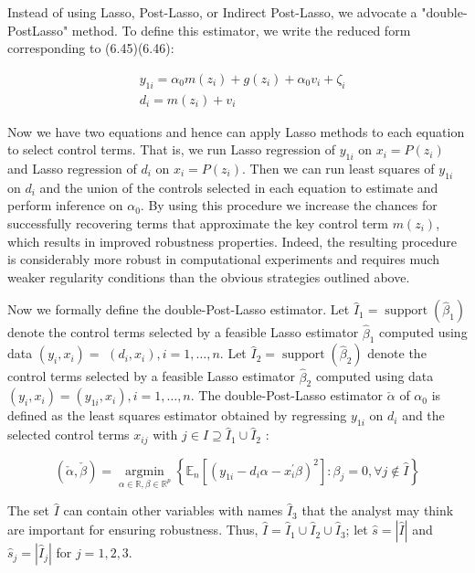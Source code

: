 \documentclass[10pt]{article}
\begin{document}
Instead of using Lasso, Post-Lasso, or Indirect Post-Lasso, we advocate a "double-PostLasso" method. To define this estimator, we write the reduced form corresponding to (6.45)(6.46):

\[
\begin{aligned}
& y_{1 i}=\alpha_{0} m\left(z_{i}\right)+g\left(z_{i}\right)+\alpha_{0} v_{i}+\zeta_{i} \\
& d_{i}=m\left(z_{i}\right)+v_{i}
\end{aligned}
\]

Now we have two equations and hence can apply Lasso methods to each equation to select control terms. That is, we run Lasso regression of \(y_{1 i}\) on \(x_{i}=P\left(z_{i}\right)\) and Lasso regression of \(d_{i}\) on \(x_{i}=P\left(z_{i}\right)\). Then we can run least squares of \(y_{1 i}\) on \(d_{i}\) and the union of the controls selected in each equation to estimate and perform inference on \(\alpha_{0}\). By using this procedure we increase the chances for successfully recovering terms that approximate the key control term \(m\left(z_{i}\right)\), which results in improved robustness properties. Indeed, the resulting procedure is considerably more robust in computational experiments and requires much weaker regularity conditions than the obvious strategies outlined above.

Now we formally define the double-Post-Lasso estimator. Let \(\widehat{I}_{1}=\operatorname{support}\left(\widehat{\beta}_{1}\right)\) denote the control terms selected by a feasible Lasso estimator \(\widehat{\beta}_{1}\) computed using data \(\left(y_{i}, x_{i}\right)=\) \(\left(d_{i}, x_{i}\right), i=1, \ldots, n\). Let \(\widehat{I}_{2}=\operatorname{support}\left(\widehat{\beta}_{2}\right)\) denote the control terms selected by a feasible Lasso estimator \(\widehat{\beta}_{2}\) computed using data \(\left(y_{i}, x_{i}\right)=\left(y_{1 i}, x_{i}\right), i=1, \ldots, n\). The double-Post-Lasso estimator \(\check{\alpha}\) of \(\alpha_{0}\) is defined as the least squares estimator obtained by regressing \(y_{1 i}\) on \(d_{i}\) and the selected control terms \(x_{i j}\) with \(j \in \widehat{I} \supseteq \widehat{I}_{1} \cup \widehat{I}_{2}\) :

\[
(\check{\alpha}, \check{\beta})=\underset{\alpha \in \mathbb{R}, \beta \in \mathbb{R}^{p}}{\operatorname{argmin}}\left\{\mathbb{E}_{n}\left[\left(y_{1 i}-d_{i} \alpha-x_{i}^{\prime} \beta\right)^{2}\right]: \beta_{j}=0, \forall j \notin \widehat{I}\right\}
\]

The set \(\widehat{I}\) can contain other variables with names \(\widehat{I}_{3}\) that the analyst may think are important for ensuring robustness. Thus, \(\widehat{I}=\widehat{I}_{1} \cup \widehat{I}_{2} \cup \widehat{I}_{3}\); let \(\widehat{s}=|\widehat{I}|\) and \(\widehat{s}_{j}=\left|\widehat{I}_{j}\right|\) for \(j=1,2,3\).
\end{document}
